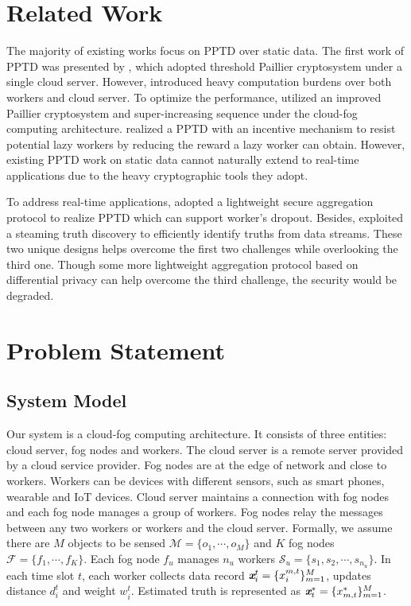 \documentclass[conference,a4paper]{IEEEtran}
\def\textbi#1{\textbf{\em #1}}
\begin{document}
\section{Related Work}\label{relatedwork}
The majority of existing works \cite{miao,rptd,inpptd} focus on PPTD over static data. The first work of PPTD was presented by \cite{miao}, which adopted threshold Paillier cryptosystem under a single cloud server. However, \cite{miao} introduced heavy computation burdens over both workers and cloud server. To optimize the performance, \cite{rptd} utilized an improved Paillier cryptosystem and super-increasing sequence under the cloud-fog computing architecture. \cite{inpptd} realized a PPTD with an incentive mechanism to resist potential lazy workers by reducing the reward a lazy worker can obtain. However, existing PPTD work on static data cannot naturally extend to real-time applications due to the heavy cryptographic tools they adopt.

To address real-time applications, \cite{rtpt} adopted a lightweight secure aggregation protocol to realize PPTD which can support worker's dropout. Besides, \cite{rtpt} exploited a steaming truth discovery to efficiently identify truths from data streams. These two unique designs helps \cite{rtpt} overcome the first two challenges while overlooking the third one. Though some more lightweight aggregation protocol \cite{gai} based on differential privacy can help overcome the third challenge, the security would be degraded.

\section{Problem Statement}\label{problem_state}
    \subsection{System Model}
    Our system is a cloud-fog computing architecture. It consists of three entities: cloud server, fog nodes and workers. The cloud server is a remote server provided by a cloud service provider. Fog nodes are at the edge of network and close to workers. Workers can be devices with different sensors, such as smart phones, wearable and IoT devices. Cloud server maintains a connection with fog nodes and each fog node manages a group of workers. Fog nodes relay the messages between any two workers or workers and the cloud server. Formally, we assume there are $M$ objects to be sensed $\mathcal{M}=\{o_1,\cdots,o_M\}$ and $K$ fog nodes $\mathcal{F}=\{f_1,\cdots,f_K\}$. Each fog node $f_u$ manages $n_u$ workers $\mathcal{S}_u=\{s_1,s_2,\cdots,s_{n_u}\}$. In each time slot $t$, each worker collects data record $\textbi{x}_i^t=\{x_i^{m,t}\}_{m=1}^M$, updates distance $d_i^t$ and weight $w_i^t$. Estimated truth is represented as $\textbi{x}_t^*=\{x_{m,t}^*\}_{m=1}^M$.
\end{document}
